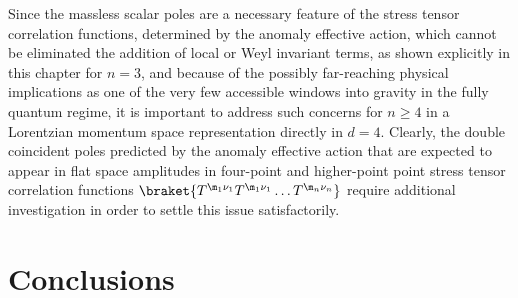 \documentclass[a4paper,11pt,openright,twoside]{book}
\let\n=\nu      \let\x=\xi     \let\p=\pi      \let\r=\rho
\numberwithin{equation}{section}
\renewcommand{\chaptermark}[1]{\markboth{#1}{}}
\begin{document}
{{Since the massless scalar poles are a necessary feature of the stress tensor correlation functions, determined by the anomaly effective action, 
which cannot be eliminated the addition of local or Weyl invariant terms, as shown explicitly in this chapter for $n=3$, and because of the possibly 
far-reaching physical implications as one of the very few accessible windows into gravity in the fully quantum regime, it is important to address 
such concerns for $n \ge 4$ in a Lorentzian momentum space representation directly in $d=4$. Clearly, the double coincident poles predicted by the anomaly effective action that are expected to appear in flat space amplitudes in four-point and higher-point point stress tensor correlation 
functions $\braket{ T^{\m_1\n_1}T^{\m_1\n_1}\dots T^{\m_n\n_n}}$ require additional investigation in order to settle this issue satisfactorily.

\chapter*{Conclusions}
\chaptermark{Conclusions}

}}
\end{document}
